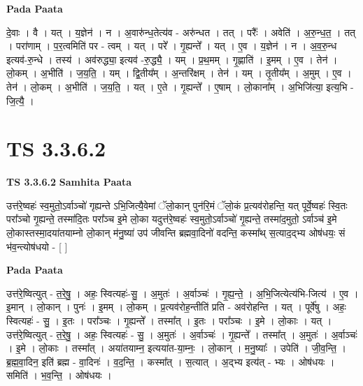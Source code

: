 \documentclass[17pt]{extarticle}
\begin{document}
\textbf{Pada Paata} \newline

दे॒वाः । वै । यत् । य॒ज्ञेन॑ । न । अ॒वारु॑न्ध॒तेत्य॑व - अरु॑न्धत । तत् । परैः᳚ । अवेति॑ । अ॒रु॒न्ध॒त॒ । तत् । परा॑णाम् । प॒र॒त्वमिति॑ पर - त्वम् । यत् । परे᳚ । गृ॒ह्यन्ते᳚ । यत् । ए॒व । य॒ज्ञेन॑ । न । अ॒व॒रु॒न्ध इत्यव॑-रु॒न्धे । तस्य॑ । अव॑रुद्ध्या॒ इत्यव॑ -रु॒द्ध्यै॒ । यम् । प्र॒थ॒मम् । गृ॒ह्णाति॑ । इ॒मम् । ए॒व । तेन॑ । लो॒कम् । अ॒भीति॑ । ज॒य॒ति॒ । यम् । द्वि॒तीय᳚म् । अ॒न्तरि॑क्षम् । तेन॑ । यम् । तृ॒तीय᳚म् । अ॒मुम् । ए॒व । तेन॑ । लो॒कम् । अ॒भीति॑ । ज॒य॒ति॒ । यत् । ए॒ते । गृ॒ह्यन्ते᳚ । ए॒षाम् । लो॒काना᳚म् । अ॒भिजि॑त्या॒ इत्य॒भि - जि॒त्यै॒ ।  \newline




\section*{ TS 3.3.6.2 }

\textbf{TS 3.3.6.2 } \newline
\textbf{Samhita Paata} \newline

उत्त॑रे॒ष्वहः॑ स्व॒मुतो॒ऽर्वाञ्चो॑ गृह्यन्ते ऽभि॒जित्यै॒वेमां ॅलो॒कान् पुन॑रि॒मं ॅलो॒कं प्र॒त्यव॑रोहन्ति॒ यत् पूर्वे॒ष्वहः॑ स्वि॒तः परा᳚ञ्चो गृ॒ह्यन्ते॒ तस्मा॑दि॒तः परा᳚ञ्च इ॒मे लो॒का यदुत्त॑रे॒ष्वहः॑ स्व॒मुतो॒ऽर्वाञ्चो॑ गृ॒ह्यन्ते॒ तस्मा॑द॒मुतो॒ ऽर्वाञ्च॑ इ॒मे लो॒कास्तस्मा॒दया॑तयाम्नो लो॒कान् म॑नु॒ष्या॑ उप॑ जीवन्ति ब्रह्मवा॒दिनो॑ वदन्ति॒ कस्मा᳚थ् स॒त्याद॒द्भ्य ओष॑धयः॒ सं भ॑व॒न्त्योष॑धयो - [  ] \newline

\textbf{Pada Paata} \newline

उत्त॑रे॒ष्वित्युत् - त॒रे॒षु॒ । अहः॒ स्वित्यहः॑-सु॒ । अ॒मुतः॑ । अ॒र्वाञ्चः॑ । गृ॒ह्य॒न्ते॒ । अ॒भि॒जित्येत्य॑भि-जित्य॑ । ए॒व । इ॒मान् । लो॒कान् । पुनः॑ । इ॒मम् । लो॒कम् । प्र॒त्यव॑रोह॒न्तीति॑ प्रति - अव॑रोहन्ति । यत् । पूर्वे॑षु । अहः॒ स्वित्यहः॑ - सु॒ । इ॒तः । परा᳚ञ्चः । गृ॒ह्यन्ते᳚ । तस्मा᳚त् । इ॒तः । परा᳚ञ्चः । इ॒मे । लो॒काः । यत् । उत्त॑रे॒ष्वित्युत् - त॒रे॒षु॒ । अहः॒ स्वित्यहः॑ - सु॒ । अ॒मुतः॑ । अ॒र्वाञ्चः॑ । गृ॒ह्यन्ते᳚ । तस्मा᳚त् । अ॒मुतः॑ । अ॒र्वाञ्चः॑ । इ॒मे । लो॒काः । तस्मा᳚त् । अया॑तयाम्न॒ इत्यया॑त-या॒म्नः॒ । लो॒कान् । म॒नु॒ष्याः᳚ । उपेति॑ । जी॒व॒न्ति॒ । ब्र॒ह्म॒वा॒दिन॒ इति॑ ब्रह्म - वा॒दिनः॑ । व॒द॒न्ति॒ । कस्मा᳚त् । स॒त्यात् । अ॒द्भ्य इत्य॑त् - भ्यः । ओष॑धयः । समिति॑ । भ॒व॒न्ति॒ । ओष॑धयः ।  \newline
\end{document}
